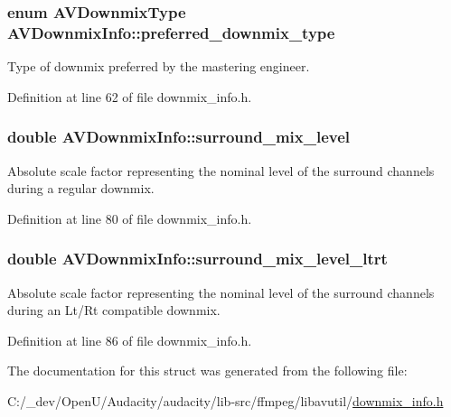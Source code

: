 \subsubsection[{\texorpdfstring{preferred\+\_\+downmix\+\_\+type}{preferred_downmix_type}}]{\setlength{\rightskip}{0pt plus 5cm}enum {\bf A\+V\+Downmix\+Type} A\+V\+Downmix\+Info\+::preferred\+\_\+downmix\+\_\+type}\hypertarget{struct_a_v_downmix_info_aca0497b3d08ecb717c349c2bcc946038}{}\label{struct_a_v_downmix_info_aca0497b3d08ecb717c349c2bcc946038}
Type of downmix preferred by the mastering engineer. 

Definition at line 62 of file downmix\+\_\+info.\+h.

\subsubsection[{\texorpdfstring{surround\+\_\+mix\+\_\+level}{surround_mix_level}}]{\setlength{\rightskip}{0pt plus 5cm}double A\+V\+Downmix\+Info\+::surround\+\_\+mix\+\_\+level}\hypertarget{struct_a_v_downmix_info_a763db6d7fd875324fff1c1cd124ac21f}{}\label{struct_a_v_downmix_info_a763db6d7fd875324fff1c1cd124ac21f}
Absolute scale factor representing the nominal level of the surround channels during a regular downmix. 

Definition at line 80 of file downmix\+\_\+info.\+h.

\subsubsection[{\texorpdfstring{surround\+\_\+mix\+\_\+level\+\_\+ltrt}{surround_mix_level_ltrt}}]{\setlength{\rightskip}{0pt plus 5cm}double A\+V\+Downmix\+Info\+::surround\+\_\+mix\+\_\+level\+\_\+ltrt}\hypertarget{struct_a_v_downmix_info_a460f7ab05d6c71112f2282aeb4009445}{}\label{struct_a_v_downmix_info_a460f7ab05d6c71112f2282aeb4009445}
Absolute scale factor representing the nominal level of the surround channels during an Lt/\+Rt compatible downmix. 

Definition at line 86 of file downmix\+\_\+info.\+h.



The documentation for this struct was generated from the following file\+:\begin{DoxyCompactItemize}
\item 
C\+:/\+\_\+dev/\+Open\+U/\+Audacity/audacity/lib-\/src/ffmpeg/libavutil/\hyperlink{downmix__info_8h}{downmix\+\_\+info.\+h}\end{DoxyCompactItemize}

